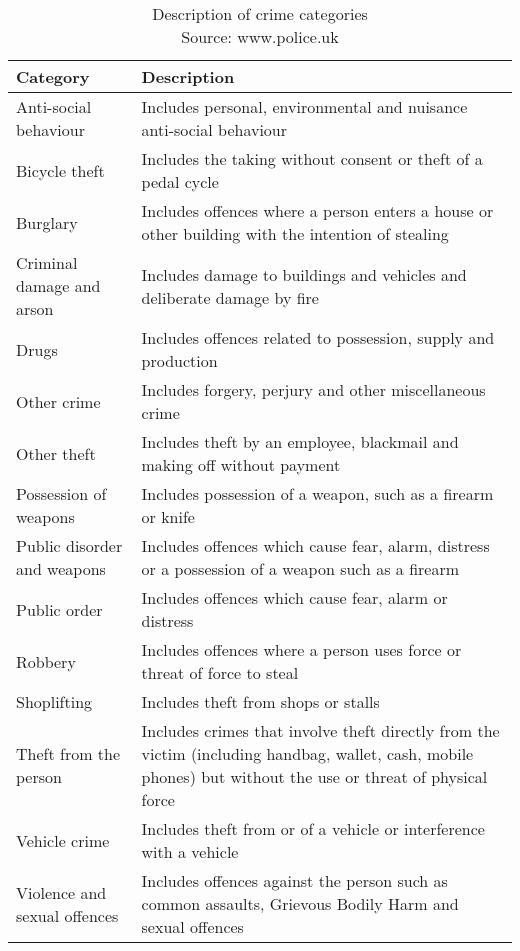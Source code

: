 \documentclass{article}
\begin{document}
	\begin{longtable}{p{2.2cm}p{7.8cm}}
		\caption{Description of crime categories \\ Source: www.police.uk}
		\label{fig:category-description} \\
		\hline
		{\bf Category} & {\bf Description} \\ \hline
		\endhead
		Anti-social behaviour & Includes personal, environmental and nuisance anti-social behaviour \\ \hline
		Bicycle theft & Includes the taking without consent or theft of a pedal cycle \\ \hline
		Burglary & Includes offences where a person enters a house or other building with the intention of stealing \\ \hline
		Criminal damage and arson & Includes damage to buildings and vehicles and deliberate damage by fire \\ \hline
		Drugs & Includes offences related to possession, supply and production \\ \hline
		Other crime & Includes forgery, perjury and other miscellaneous crime \\ \hline
		Other theft & Includes theft by an employee, blackmail and making off without payment \\ \hline
		Possession of weapons & Includes possession of a weapon, such as a firearm or knife \\ \hline
		Public disorder and weapons & Includes offences which cause fear, alarm, distress or a possession of a weapon such as a firearm \\ \hline
		Public order & Includes offences which cause fear, alarm or distress \\ \hline
		Robbery & Includes offences where a person uses force or threat of force to steal \\ \hline
		Shoplifting & Includes theft from shops or stalls \\ \hline
		Theft from the person & Includes crimes that involve theft directly from the victim (including handbag, wallet, cash, mobile phones) but without the use or threat of physical force \\ \hline
		Vehicle crime & Includes theft from or of a vehicle or interference with a vehicle \\ \hline
		Violence and sexual offences & Includes offences against the person such as common assaults, Grievous Bodily Harm and sexual offences \\ \hline
	\end{longtable}
\end{document}

